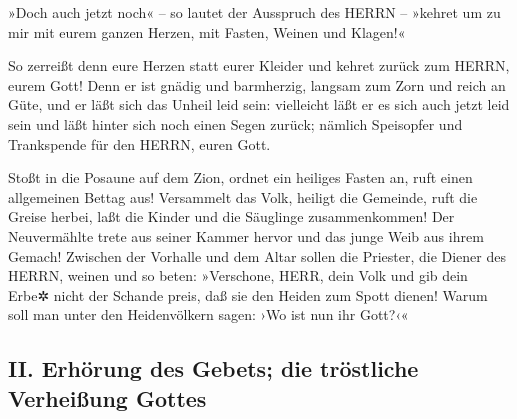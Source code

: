 »Doch auch jetzt noch« -- so lautet der Ausspruch des
HERRN -- »kehret um zu mir mit eurem ganzen Herzen, mit Fasten, Weinen
und Klagen!«

So zerreißt denn eure Herzen statt eurer Kleider und
kehret zurück zum HERRN, eurem Gott! Denn er ist gnädig und barmherzig,
langsam zum Zorn und reich an Güte, und er läßt sich das Unheil leid
sein: vielleicht läßt er es sich auch jetzt leid sein und
läßt hinter sich noch einen Segen zurück; nämlich Speisopfer und
Trankspende für den HERRN, euren Gott.

Stoßt in die Posaune auf dem Zion, ordnet ein heiliges
Fasten an, ruft einen allgemeinen Bettag aus! Versammelt
das Volk, heiligt die Gemeinde, ruft die Greise herbei, laßt die Kinder
und die Säuglinge zusammenkommen! Der Neuvermählte trete aus seiner
Kammer hervor und das junge Weib aus ihrem Gemach!
Zwischen der Vorhalle und dem Altar sollen die Priester,
die Diener des HERRN, weinen und so beten: »Verschone, HERR, dein Volk
und gib dein Erbe✲ nicht der Schande preis, daß sie den Heiden zum Spott
dienen! Warum soll man unter den Heidenvölkern sagen: ›Wo ist nun ihr
Gott?‹«

\hypertarget{ii.-erhuxf6rung-des-gebets-die-truxf6stliche-verheiuxdfung-gottes}{%
\subsection{II. Erhörung des Gebets; die tröstliche Verheißung
Gottes}\label{ii.-erhuxf6rung-des-gebets-die-truxf6stliche-verheiuxdfung-gottes}}

